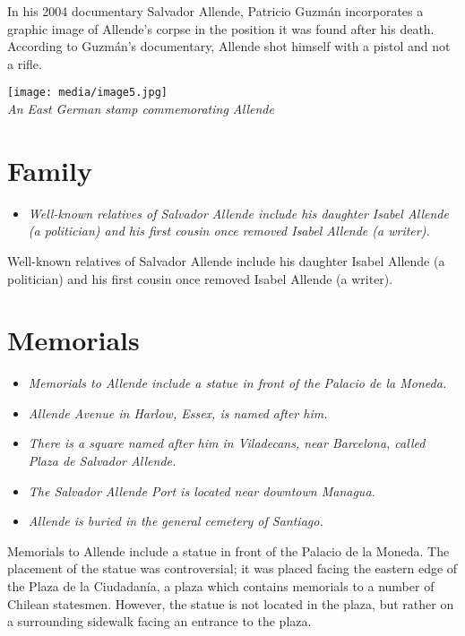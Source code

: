 In his 2004 documentary Salvador Allende, Patricio Guzmán incorporates a
graphic image of Allende's corpse in the position it was found after his
death. According to Guzmán's documentary, Allende shot himself with a
pistol and not a rifle.

\texttt{[image: media/image5.jpg]}\\
\emph{An East German stamp commemorating Allende}

\section{Family}\label{family}

\begin{itemize}
\item
  \emph{Well-known relatives of Salvador Allende include his daughter
  Isabel Allende (a politician) and his first cousin once removed Isabel
  Allende (a writer).}
\end{itemize}

Well-known relatives of Salvador Allende include his daughter Isabel
Allende (a politician) and his first cousin once removed Isabel Allende
(a writer).

\section{Memorials}\label{memorials}

\begin{itemize}
\item
  \emph{Memorials to Allende include a statue in front of the Palacio de
  la Moneda.}
\item
  \emph{Allende Avenue in Harlow, Essex, is named after him.}
\item
  \emph{There is a square named after him in Viladecans, near Barcelona,
  called Plaza de Salvador Allende.}
\item
  \emph{The Salvador Allende Port is located near downtown Managua.}
\item
  \emph{Allende is buried in the general cemetery of Santiago.}
\end{itemize}

Memorials to Allende include a statue in front of the Palacio de la
Moneda. The placement of the statue was controversial; it was placed
facing the eastern edge of the Plaza de la Ciudadanía, a plaza which
contains memorials to a number of Chilean statesmen. However, the statue
is not located in the plaza, but rather on a surrounding sidewalk facing
an entrance to the plaza.

